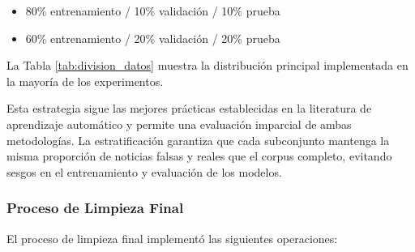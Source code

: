 \begin{itemize}
    \item 80\% entrenamiento / 10\% validación / 10\% prueba
    \item 60\% entrenamiento / 20\% validación / 20\% prueba
\end{itemize}

La Tabla \ref{tab:division_datos} muestra la distribución principal implementada en la mayoría de los experimentos.

\begin{table}[htbp]
\centering
{}
\caption{División estratificada principal del corpus para entrenamiento y evaluación.}
\label{tab:division_datos}
\end{table}

Esta estrategia sigue las mejores prácticas establecidas en la literatura de aprendizaje automático y permite una evaluación imparcial de ambas metodologías. La estratificación garantiza que cada subconjunto mantenga la misma proporción de noticias falsas y reales que el corpus completo, evitando sesgos en el entrenamiento y evaluación de los modelos.

\subsubsection{Proceso de Limpieza Final}

El proceso de limpieza final implementó las siguientes operaciones:

